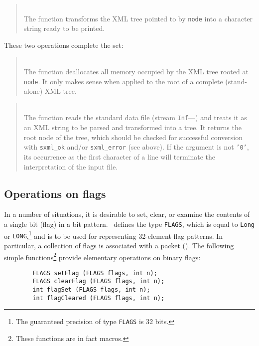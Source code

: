 \begin{quote}
\noindent\hspace{-0.35in}{\tt char *sxml\_toxml (sxml\_t node); }\\ \hspace{0in}
The function transforms the XML tree pointed to by {\tt node} into a
character string ready to be printed.
\end{quote}

These two operations complete the set:

\begin{quote}
\noindent\hspace{-0.35in}{\tt void sxml\_free (sxml\_t node); }\\ \hspace{0in}
The function deallocates all memory occupied by the XML tree rooted at
{\tt node}.
It only makes sense when applied to the root of a complete (stand-alone)
XML tree.
\end{quote}

\begin{quote}
\noindent{}\\ \hspace{0in}
The function reads the standard data file (stream {\tt Inf}---)
and treats it as an XML string to be parsed and transformed into a tree.
It returns the root node of the tree, which should be checked for 
successful conversion with {\tt sxml\_ok} and/or {\tt sxml\_error} (see above).
If the argument is not {\tt '{}0'}, its occurrence as the first
character of a line will terminate the interpretation of the input file.
\end{quote}

\subsection{Operations on flags}
\label{rm_au_fl}

In a number of situations, it is desirable to set,
clear, or examine the contents of a single bit (flag) in a bit pattern.
\smurph\ defines the type {\tt FLAGS}, which is equal to {\tt Long} or
{\tt LONG},\footnote{The guaranteed precision of type {\tt FLAGS} is 32 bits.}
and is to be used for representing 32-element flag patterns.
In particular, a collection of flags is associated with
a packet ().
The following simple functions\footnote{These functions are in fact
macros.} provide elementary operations on binary flags:
\begin{verbatim}
        FLAGS setFlag (FLAGS flags, int n);
        FLAGS clearFlag (FLAGS flags, int n);
        int flagSet (FLAGS flags, int n);
        int flagCleared (FLAGS flags, int n);
\end{verbatim}

